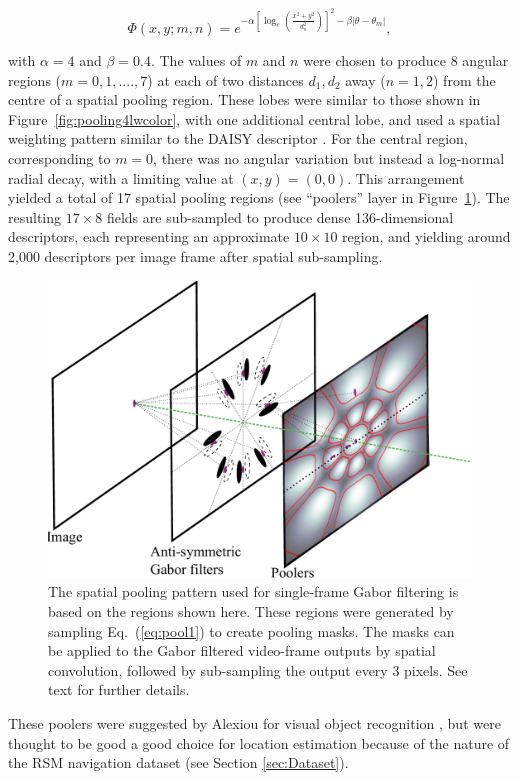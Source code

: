 \begin{equation}
\Phi(x,y;m,n) = e^{-\alpha \left [\log_e \left ( \frac{x^2+y^2}{d_n^2}\right ) \right ]^2 - \beta |\theta-\theta_m | },
\label{eq:pool1}
\end{equation}

\noindent with $\alpha = 4$ and $\beta = 0.4$. The values of $m$ and $n$ were chosen to produce 8 angular regions ($m = 0, 1, ...., 7$) at each of two distances $d_1, d_2$ away ($n=1,2$) from the centre of a spatial pooling region. These lobes were similar to those shown in Figure~\ref{fig:pooling4lwcolor}, with one additional central lobe, and used a spatial weighting pattern similar to the DAISY descriptor \cite{Winder2009}. For the central region, corresponding to $m=0$, there was no angular variation but instead a log-normal radial decay, with a limiting value at $(x,y)=(0,0)$. This arrangement yielded a total of  17 spatial pooling regions (see ``poolers'' layer in Figure~\ref{fig:IsoPool}). The resulting $17 \times 8$ fields are sub-sampled to produce dense 136-dimensional descriptors, each representing an approximate $10 \times 10$ region, and yielding around 2,000 descriptors per image frame after spatial sub-sampling. 

\begin{figure}[t]
\centering
\includegraphics[width=0.7\linewidth]{./gfx/Chapter04/Layers.pdf}
\caption{The spatial pooling pattern used for single-frame Gabor filtering is based on the regions shown here.  These regions were generated by sampling Eq.~(\ref{eq:pool1}) to create pooling masks. The masks can be applied to the Gabor filtered video-frame outputs by spatial convolution, followed by sub-sampling the output every 3 pixels. See text for further details.}
\label{fig:IsoPool}
\end{figure}

These poolers were suggested by Alexiou for visual object recognition \cite{Alexiou2013}, but were thought to be good a good choice for location estimation because of the nature of the RSM navigation dataset (see Section \ref{sec:Dataset}).

